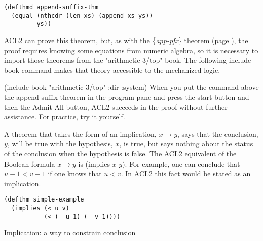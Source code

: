 \begin{Verbatim}
(defthmd append-suffix-thm
  (equal (nthcdr (len xs) (append xs ys))
         ys))
\end{Verbatim}

ACL2 can prove this theorem, but,
as with the \{\emph{app-pfx}\} theorem (page \pageref{app-pfx-thm}),
the proof requires knowing some equations from numeric algebra,
so it is necessary to import those theorems from the
\label{arith-top-book}
"arithmetic-3/top" book.
The following include-book command makes that theory accessible to the mechanized logic.

(include-book "arithmetic-3/top" :dir :system)
\newline
When you put the command above the append-suffix theorem in the program pane
and press the start button and then the Admit All button,
ACL2 succeeds in the proof without further assistance. For practice, try it yourself.

\begin{aside}
A theorem that takes the form of an implication, $x \rightarrow y$,
says that the conclusion, $y$, will be true with the hypothesis, $x$,
is true, but says nothing about the status of the conclusion when
the hypothesis is false. The ACL2 equivalent of the Boolean formula $x \rightarrow y$
is (implies $x$ $y$).
For example, one can conclude that $u - 1 < v - 1$
if one knows that $u < v$.
In ACL2 this fact would be stated as an implication.
\begin{Verbatim}
(defthm simple-example
  (implies (< u v)
           (< (- u 1) (- v 1))))
\end{Verbatim}
\caption{Implication: a way to constrain conclusion}
\label{implies-def}
\end{aside}


